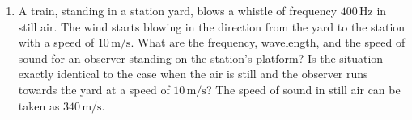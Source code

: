 \begin{enumerate}[label=\thesection.\arabic*,ref=\thesection.\theenumi]
\item A train, standing in a station yard, blows a whistle of frequency $400 \, \text{Hz}$ in still air. The wind starts blowing in the direction from the yard to the station with a speed of $10 \, \text{m/s}$. What are the frequency, wavelength, and the speed of sound for an observer standing on the station's platform? Is the situation exactly identical to the case when the air is still and the observer runs towards the yard at a speed of $10\, \text{m/s}$? The speed of sound in still air can be taken as $340\, \text{m/s}$.\\
\solution
\pagebreak

\end{enumerate}

